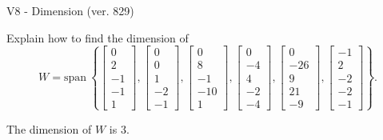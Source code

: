 \begin{exercise}
  \begin{exerciseTitle}V8 - Dimension (ver. 829)\end{exerciseTitle}
  \begin{exerciseStatement}
    Explain how to find the dimension of 
\[W=\mathrm{span}\ \left\{\left[\begin{array}{r}
0 \\
2 \\
-1 \\
-1 \\
1
\end{array}\right] , \left[\begin{array}{r}
0 \\
0 \\
1 \\
-2 \\
-1
\end{array}\right] , \left[\begin{array}{r}
0 \\
8 \\
-1 \\
-10 \\
1
\end{array}\right] , \left[\begin{array}{r}
0 \\
-4 \\
4 \\
-2 \\
-4
\end{array}\right] , \left[\begin{array}{r}
0 \\
-26 \\
9 \\
21 \\
-9
\end{array}\right] , \left[\begin{array}{r}
-1 \\
2 \\
-2 \\
-2 \\
-1
\end{array}\right]\right\}.\]



  \end{exerciseStatement}
  \begin{exerciseAnswer}
   The dimension of \(W\) is  \(3\).
  


  \end{exerciseAnswer}
\end{exercise}